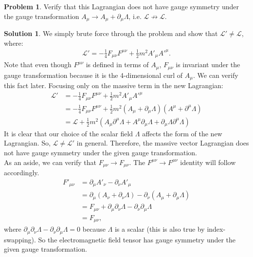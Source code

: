 \documentclass{book}
\numberwithin{equation}{section}
\theoremstyle{definition}
\newtheorem{prob}{Problem}[section]
\newtheorem{sln}{Solution}[section]
\newcommand{\p}{\partial}
\newcommand{\lag}{\mathcal{L}}
\begin{document}
\begin{prob}
	Verify that this Lagrangian does not have gauge symmetry under the gauge transformation $A_\mu \to A_\mu +\p_\mu \Lambda$, i.e. $\lag \not\to \lag$.\\
	\begin{sln}
		We simply brute force through the problem and show that $\lag' \neq \lag$, where:
		\begin{align}
		\lag' = -\frac{1}{4}F_{\mu\nu}F^{\mu\nu} + \frac{1}{2}m^2 A'_\mu A'^\mu.
		\end{align}
		Note that even though $F^{\mu\nu}$ is defined in terms of $A_\mu$, $F_{\mu\nu}$ is invariant under the gauge transformation because it is the 4-dimensional curl of $A_\mu$. We can verify this fact later. Focusing only on the massive term in the new Lagrangian:
		\begin{align}
		\lag' &= -\frac{1}{4}F_{\mu\nu}F^{\mu\nu} + \frac{1}{2}m^2 A'_\mu A'^\mu\\
		&= -\frac{1}{4}F_{\mu\nu}F^{\mu\nu} +\frac{1}{2}m^2(A_\mu + \p_\mu \Lambda)(A^\mu + \p^\mu \Lambda)\\
		&= \lag + \frac{1}{2}m^2(A_\mu \p^\mu\Lambda + A^\mu \p_\mu \Lambda + \p_\mu\Lambda \p^\mu \Lambda)
		\end{align}
		It is clear that our choice of the scalar field $\Lambda$ affects the form of the new Lagrangian. So, $\lag \neq \lag'$ in general. Therefore, the massive vector Lagrangian does not have gauge symmetry under the given gauge transformation.\\
		
		As an aside, we can verify that $F_{\mu\nu}\to F_{\mu\nu}$. The $F^{\mu\nu} \to F^{\mu\nu}$ identity will follow accordingly. 
		\begin{align}
		F'_{\mu\nu} &= \p_\mu A'_\nu - \p_\nu A'_\mu\\
		&= \p_\mu(A_\nu + \p_\nu\Lambda) - \p_\nu(A_\mu + \p_\mu\Lambda)\\
		&= F_{\mu\nu} + \p_\mu \p_\nu \Lambda - \p_\nu \p_\mu\Lambda\\
		&= F_{\mu\nu},
		\end{align}
		where $\p_\mu \p_\nu \Lambda - \p_\nu \p_\mu\Lambda=0$ because $\Lambda$ is a scalar (this is also true by index-swapping). So the electromagnetic field tensor has gauge symmetry under the given gauge transformation. \\
	\end{sln}
\end{prob}


\newpage
\end{document}
